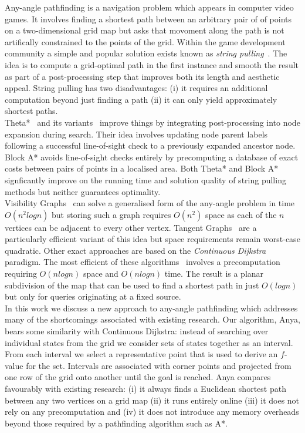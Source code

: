 Any-angle pathfinding is a navigation problem which appears in computer
video games. It involves finding a shortest path between an arbitrary pair of
 of points on a two-dimensional grid map but asks that movoment along the 
path is not artifically constrained to the points of the grid. 
Within the game development community a simple and popular solution exists
known as \emph{string pulling}~\cite{pinter01,botea04}.
The idea is to compute a grid-optimal path in the first
instance and smooth the result as part of a post-processing step that improves
both its length and aesthetic appeal. String pulling has two disadvantages: 
(i) it requires an additional computation beyond just finding a path (ii)
it can only yield approximately shortest paths.
\\
Theta*~\cite{nash07} and its variants~\cite{nash09,nash10} improve things 
by integrating post-processing into node expansion during search. Their 
idea involves updating node parent labels following a successful line-of-sight
check to a previously expanded ancestor node.
Block A*\cite{yap11} avoids line-of-sight checks entirely by precomputing
a database of exact costs between pairs of points in a localised area.
Both Theta* and Block A* signficantly improve on the running time and 
solution quality of string pulling methods but neither guarantees optimality.
\\
Visibility Graphs~\cite{lozanoperez79} can solve a generalised form of 
the any-angle problem in time $O(n^2log{n})$ but storing such a graph 
requires $O(n^2)$ space as each of the $n$ vertices can be adjacent to 
every other vertex.  Tangent Graphs~\cite{liu92} are a particularly efficient 
variant of this idea but space requirements remain worst-case quadratic. 
Other exact approaches are based on the 
\textit{Continuous Dijkstra}~\cite{mitchell87} paradigm.
The most efficient of these algorithms~\cite{hershberger99} involves a
precomputation requiring $O(nlogn)$ space and $O(nlogn)$ time.  The result 
is a planar subdivision of the map that can be used to find a shortest path in 
just $O(logn)$ but only for queries originating at a fixed source.
\\
In this work we discuss a new approach to any-angle pathfinding which
addresses many of the shortcomings associated with existing research.
Our algorithm, Anya, bears some similarity with Continuous Dijkstra: 
instead of searching over individual states from the grid we consider
sets of states together as an interval. From each interval we select a 
representative point that is used to derive an $f$-value for the set.
Intervals are associated with corner points and projected from one 
row of the grid onto another until the goal is reached.
Anya compares favourably with existing research: (i)
it always finds a Euclidean shortest path between any two vertices on
a grid map (ii) it runs entirely online (iii) it does not rely on any 
precomputation and (iv) it does not introduce any memory overheads beyond
those required by a pathfinding algorithm such as A*.

